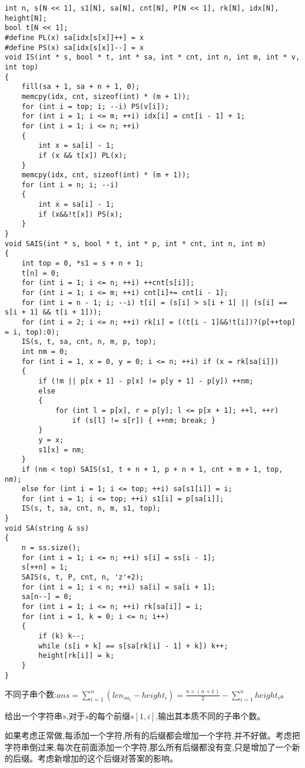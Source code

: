 \documentclass[a4paper,fontset=none]{ctexart}
\begin{document}
\begin{verbatim}
int n, s[N << 1], s1[N], sa[N], cnt[N], P[N << 1], rk[N], idx[N], height[N];
bool t[N << 1];
#define PL(x) sa[idx[s[x]]++] = x
#define PS(x) sa[idx[s[x]]--] = x
void IS(int * s, bool * t, int * sa, int * cnt, int n, int m, int * v, int top)
{
    fill(sa + 1, sa + n + 1, 0);
    memcpy(idx, cnt, sizeof(int) * (m + 1));
    for (int i = top; i; --i) PS(v[i]);
    for (int i = 1; i <= m; ++i) idx[i] = cnt[i - 1] + 1;
    for (int i = 1; i <= n; ++i)
    {
        int x = sa[i] - 1;
        if (x && t[x]) PL(x);
    }
    memcpy(idx, cnt, sizeof(int) * (m + 1));
    for (int i = n; i; --i)
    {
        int x = sa[i] - 1;
        if (x&&!t[x]) PS(x);
    }
}
void SAIS(int * s, bool * t, int * p, int * cnt, int n, int m)
{
    int top = 0, *s1 = s + n + 1;
    t[n] = 0;
    for (int i = 1; i <= n; ++i) ++cnt[s[i]];
    for (int i = 1; i <= m; ++i) cnt[i]+= cnt[i - 1];
    for (int i = n - 1; i; --i) t[i] = (s[i] > s[i + 1] || (s[i] == s[i + 1] && t[i + 1]));
    for (int i = 2; i <= n; ++i) rk[i] = ((t[i - 1]&&!t[i])?(p[++top] = i, top):0);
    IS(s, t, sa, cnt, n, m, p, top);
    int nm = 0;
    for (int i = 1, x = 0, y = 0; i <= n; ++i) if (x = rk[sa[i]])
    {
        if (!m || p[x + 1] - p[x] != p[y + 1] - p[y]) ++nm;
        else
        {
            for (int l = p[x], r = p[y]; l <= p[x + 1]; ++l, ++r)
                if (s[l] != s[r]) { ++nm; break; }
        }
        y = x;
        s1[x] = nm;
    }
    if (nm < top) SAIS(s1, t + n + 1, p + n + 1, cnt + m + 1, top, nm);
    else for (int i = 1; i <= top; ++i) sa[s1[i]] = i;
    for (int i = 1; i <= top; ++i) s1[i] = p[sa[i]];
    IS(s, t, sa, cnt, n, m, s1, top);
}
void SA(string & ss)
{
    n = ss.size();
    for (int i = 1; i <= n; ++i) s[i] = ss[i - 1];
    s[++n] = 1;
    SAIS(s, t, P, cnt, n, 'z'+2);
    for (int i = 1; i < n; ++i) sa[i] = sa[i + 1];
    sa[n--] = 0;
    for (int i = 1; i <= n; ++i) rk[sa[i]] = i;
    for (int i = 1, k = 0; i <= n; i++)
    {
        if (k) k--;
        while (s[i + k] == s[sa[rk[i] - 1] + k]) k++;
        height[rk[i]] = k;
    }
}
\end{verbatim}

不同子串个数:$ans=\sum\limits_{i=1}^n{(len_{sa_i}-height_i)}=\frac{n\times (n+1)}{2}-\sum\limits_{i=1}^n height_i$。

给出一个字符串$s$,对于$s的每个前缀s[1,i]$,输出其本质不同的子串个数。

如果考虑正常做,每添加一个字符,所有的后缀都会增加一个字符,并不好做。考虑把字符串倒过来,每次在前面添加一个字符,那么所有后缀都没有变,只是增加了一个新的后缀。考虑新增加的这个后缀对答案的影响。
\end{document}

